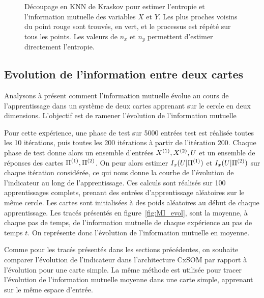 \begin{figure}
\begin{minipage}{0.45\textwidth}
\caption{Découpage en KNN de Kraskov pour estimer l'entropie et l'information mutuelle des variables $X$ et $Y$. Les plus proches voisins du point rouge sont trouvés, en vert, et le processus est répété sur tous les points. Les valeurs de $n_x$ et $n_y$ permettent d'estimer directement l'entropie.}
\label{fig:kraskov}
\end{minipage}
\end{figure}


\subsection{Evolution de l'information entre deux cartes}

Analysons à présent comment l'information mutuelle évolue au cours de l'apprentissage dans un système de deux cartes apprenant sur le cercle en deux dimensions. L'objectif est de ramener l'évolution de l'information mutuelle 

Pour cette expérience, une phase de test sur 5000 entrées test est réalisée toutes les 10 itérations, puis toutes les 200 itérations à partir de l'itération 200. Chaque phase de test donne alors un ensemble d'entrées $X^{({1})}, X^{({2})}, U$ et un ensemble de réponses des cartes $\Pi^{({1})}, \Pi^{({2})}$. On peur alors estimer $I_x(U|\Pi^{({1})})$ et $I_x(U|\Pi^{({2})})$ sur chaque itération considérée, ce qui nous donne la courbe de l'évolution de l'indicateur au long de l'apprentissage. 
Ces calculs sont réalisés sur 100 apprentissages complets, prenant des entrées d'apprentissage aléatoires sur le même cercle. Les cartes sont initialisées à des poids aléatoires au début de chaque apprentissage. 
Les tracés présentés en figure~\ref{fig:MI_evol}, sont la moyenne, à chaque pas de temps, de l'information mutuelle de chaque expérience au pas de temps $t$. On représente donc l'évolution de l'information mutuelle en moyenne. 

Comme pour les tracés présentés dans les sections précédentes, on souhaite comparer l'évolution de l'indicateur dans l'architecture CxSOM par rapport à l'évolution pour une carte simple. La même méthode est utilisée pour tracer l'évolution de l'information mutuelle moyenne dans une carte simple, apprenant sur le même espace d'entrée.

